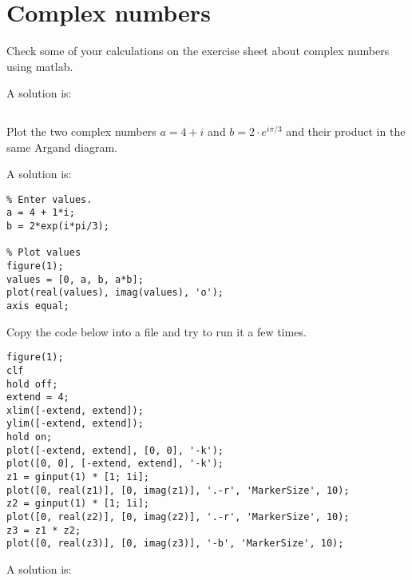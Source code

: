 \section{Complex numbers}

\begin{ex}
Check some of your calculations on the exercise sheet about complex
numbers using matlab.
\begin{hint}
\end{hint}
\begin{sol}
A solution is:
\begin{lstlisting}
\end{lstlisting}
\end{sol}
\end{ex}

\begin{ex}
Plot the two complex numbers $a = 4 + i$ and 
$b = 2 \cdot e^{i \pi / 3}$ and their
product in the same Argand diagram.
\begin{hint}
\end{hint}
\begin{sol}
A solution is:
\begin{lstlisting}
% Enter values.
a = 4 + 1*i;
b = 2*exp(i*pi/3);

% Plot values
figure(1);
values = [0, a, b, a*b];
plot(real(values), imag(values), 'o');
axis equal;
\end{lstlisting}
\end{sol}
\end{ex}


\begin{ex}
Copy the code below into a file and try to run it a few times.
\begin{lstlisting}
figure(1);
clf
hold off;
extend = 4;
xlim([-extend, extend]);
ylim([-extend, extend]);
hold on;
plot([-extend, extend], [0, 0], '-k');
plot([0, 0], [-extend, extend], '-k');
z1 = ginput(1) * [1; 1i];
plot([0, real(z1)], [0, imag(z1)], '.-r', 'MarkerSize', 10);
z2 = ginput(1) * [1; 1i];
plot([0, real(z2)], [0, imag(z2)], '.-r', 'MarkerSize', 10);
z3 = z1 * z2;
plot([0, real(z3)], [0, imag(z3)], '-b', 'MarkerSize', 10);\end{lstlisting}
\begin{hint}
\end{hint}
\begin{sol}
A solution is:
\begin{lstlisting}
\end{lstlisting}
\end{sol}
\end{ex}



